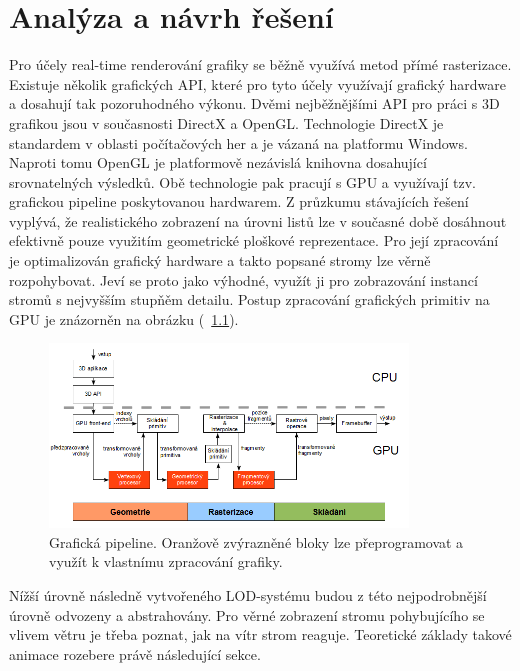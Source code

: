 \chapter{Analýza a návrh řešení}
\label{chap:analyza}

Pro účely real-time renderování grafiky se běžně využívá metod přímé rasterizace. Existuje několik grafických API, které pro tyto účely využívají grafický hardware a dosahují tak pozoruhodného výkonu. Dvěmi nejběžnějšími API pro práci s 3D grafikou jsou v současnosti DirectX a OpenGL. Technologie DirectX je standardem v oblasti počítačových her a je vázaná na platformu Windows. Naproti tomu OpenGL je platformově nezávislá knihovna dosahující srovnatelných výsledků. Obě technologie pak pracují s GPU a využívají tzv. grafickou pipeline poskytovanou hardwarem.
Z průzkumu stávajících řešení vyplývá, že realistického zobrazení na úrovni listů lze v současné době dosáhnout efektivně pouze využitím geometrické ploškové reprezentace. Pro její zpracování je optimalizován grafický hardware a takto popsané stromy lze věrně rozpohybovat. Jeví se proto jako výhodné, využít ji pro zobrazování instancí stromů s nejvyšším stupňěm detailu. Postup zpracování grafických primitiv na GPU je znázorněn na obrázku (~\ref{fig:gpupipeline}).

\begin{figure}[!hbt]
\begin{center}
\includegraphics[width=0.85\textwidth]{./figures/GPUpipeline.png}
\end{center}
\caption[Grafická pipeline]%
{Grafická pipeline. Oranžově zvýrazněné bloky lze přeprogramovat a využít k vlastnímu zpracování grafiky.
\label{fig:gpupipeline}
}
\end{figure}


Nížší úrovně následně vytvořeného LOD-systému budou z této nejpodrobnější úrovně odvozeny a abstrahovány. Pro věrné zobrazení stromu pohybujícího se vlivem větru je třeba poznat, jak na vítr strom reaguje. Teoretické základy takové animace rozebere právě následující sekce.


